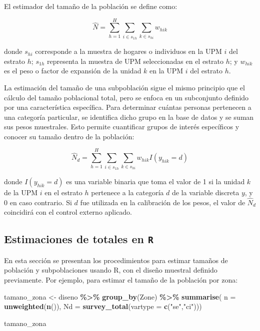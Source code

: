 \documentclass[
  spanish,
  12pt,
]{book}
\newenvironment{Shaded}{\begin{snugshade}}{\end{snugshade}}
\newcommand{\AttributeTok}[1]{\textcolor[rgb]{0.13,0.29,0.53}{#1}}
\newcommand{\FunctionTok}[1]{\textcolor[rgb]{0.13,0.29,0.53}{\textbf{#1}}}
\newcommand{\NormalTok}[1]{#1}
\newcommand{\OtherTok}[1]{\textcolor[rgb]{0.56,0.35,0.01}{#1}}
\newcommand{\SpecialCharTok}[1]{\textcolor[rgb]{0.81,0.36,0.00}{\textbf{#1}}}
\newcommand{\StringTok}[1]{\textcolor[rgb]{0.31,0.60,0.02}{#1}}
\begin{document}
El estimador del tamaño de la población se define como:

\[\hat{N} = \sum_{h=1}^{H} \sum_{i \in s_{1h}} \sum_{k \in s_{hi}} w_{hik}\]

donde \(s_{hi}\) corresponde a la muestra de hogares o individuos en la UPM \(i\) del estrato \(h\); \(s_{1h}\) representa la muestra de UPM seleccionadas en el estrato \(h\); y \(w_{hik}\) es el peso o factor de expansión de la unidad \(k\) en la UPM \(i\) del estrato \(h\).

La estimación del tamaño de una subpoblación sigue el mismo principio que el cálculo del tamaño poblacional total, pero se enfoca en un subconjunto definido por una característica específica. Para determinar cuántas personas pertenecen a una categoría particular, se identifica dicho grupo en la base de datos y se suman sus pesos muestrales. Esto permite cuantificar grupos de interés específicos y conocer su tamaño dentro de la población:

\[\hat{N}_d = \sum_{h=1}^{H} \sum_{i \in s_{1h}} \sum_{k \in s_{hi}} w_{hik} I(y_{hik}=d)\]

donde \(I(y_{hik}=d)\) es una variable binaria que toma el valor de 1 si la unidad \(k\) de la UPM \(i\) en el estrato \(h\) pertenece a la categoría \(d\) de la variable discreta \(y\), y 0 en caso contrario. Si \(d\) fue utilizada en la calibración de los pesos, el valor de \(\hat{N}_d\) coincidirá con el control externo aplicado.

\subsection*{\texorpdfstring{Estimaciones de totales en \texttt{R}}{Estimaciones de totales en R}}\label{estimaciones-de-totales-en-r}

En esta sección se presentan los procedimientos para estimar tamaños de población y subpoblaciones usando R, con el diseño muestral definido previamente. Por ejemplo, para estimar el tamaño de la población por zona:

\begin{Shaded}
\begin{Highlighting}[]
\NormalTok{tamano\_zona }\OtherTok{\textless{}{-}}\NormalTok{ diseno }\SpecialCharTok{\%\textgreater{}\%} \FunctionTok{group\_by}\NormalTok{(Zone) }\SpecialCharTok{\%\textgreater{}\%} 
               \FunctionTok{summarise}\NormalTok{( }\AttributeTok{n =} \FunctionTok{unweighted}\NormalTok{(}\FunctionTok{n}\NormalTok{()), }
                          \AttributeTok{Nd =} \FunctionTok{survey\_total}\NormalTok{(}\AttributeTok{vartype =} \FunctionTok{c}\NormalTok{(}\StringTok{"se"}\NormalTok{,}\StringTok{"ci"}\NormalTok{)))}

\NormalTok{tamano\_zona}
\end{Highlighting}
\end{Shaded}
\end{document}
